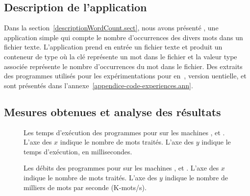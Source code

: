 \subsection{Description de l'application }

Dans la section~\ref{descriptionWordCount.sect}, nous avons pr\'esent\'e , une application simple qui compte le nombre d'occurrences des divers mots dans un fichier texte. L'application prend en entr\'ee un fichier texte et produit un conteneur de type  où la cl\'e repr\'esente un mot dans le fichier et la valeur  type   associ\'ee repr\'esente le nombre d'occurrences du mot dans le fichier. Des extraits des programmes utilis\'es pour les exp\'erimentations pour  en~,  version uentielle,  et  sont pr\'esent\'es dans l'annexe~\ref{appendice-code-experiences.ann}.

\subsection{Mesures obtenues et analyse des r\'esultats}

\begin{figure}



\caption[Les temps d'exécution des programmes pour  sur
les machines ,  et .]{Les temps d'exécution des programmes
pour  sur les machines ,  et . L'axe des $x$
indique le nombre de mots traités. L'axe des $y$ indique le temps
d'exécution, en millisecondes.}
\label{WordCount-temps.fig}
\end{figure}


\begin{figure}



\caption[Les débits pour  sur
les machines ,  et .]{Les débits des programmes
pour  sur les machines ,  et . L'axe des $x$
indique le nombre de mots traités. L'axe des $y$ indique le nombre de
milliers de mots par seconde (K-mots/s).}
\label{WordCount-debits.fig}
\end{figure}


